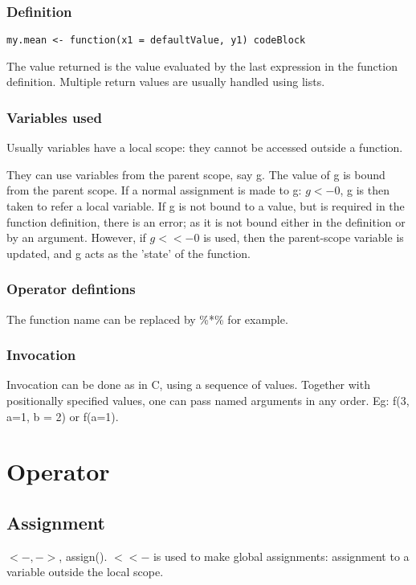 \documentclass[oneside, article]{memoir}
\begin{document}
\subsubsection{Definition}
\begin{verbatim}
my.mean <- function(x1 = defaultValue, y1) codeBlock
\end{verbatim}

The value returned is the value evaluated by the last expression in the function definition. Multiple return values are usually handled using lists.

\subsubsection{Variables used}
Usually variables have a local scope: they cannot be accessed outside a function.

They can use variables from the parent scope, say g. The value of g is bound from the parent scope. If a normal assignment is made to g: $g <- 0$, g is then taken to refer a local variable. If g is not bound to a value, but is required in the function definition, there is an error; as it is not bound either in the definition or by an argument. However, if $g <<- 0$ is used, then the parent-scope variable is updated, and g acts as the 'state' of the function. 

\subsubsection{Operator defintions}
The function name can be replaced by \%*\% for example.

\subsubsection{Invocation}
Invocation can be done as in C, using a sequence of values. Together with positionally specified values, one can pass named arguments in any order. Eg: f(3, a=1, b = 2) or f(a=1).

\section{Operator}
\subsection{Assignment}
$<-, ->$, assign(). $<<-$ is used to make global assignments: assignment to a variable outside the local scope.
\end{document}
